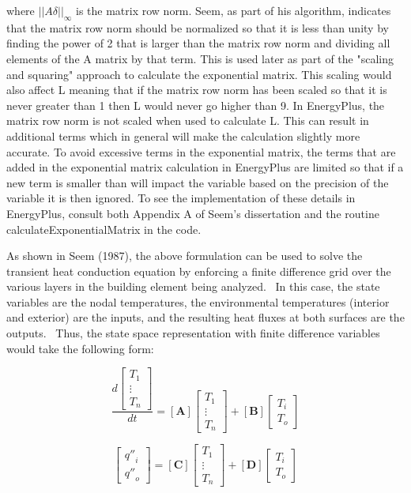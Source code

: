 where \(||A \delta||_\infty\) is the matrix row norm.  Seem, as part of his algorithm, indicates that the matrix row norm should be normalized so that it is less than unity by finding the power of 2 that is larger than the matrix row norm and dividing all elements of the A matrix by that term.  This is used later as part of the "scaling and squaring" approach to calculate the exponential matrix.  This scaling would also affect L meaning that if the matrix row norm has been scaled so that it is never greater than 1 then L would never go higher than 9.  In EnergyPlus, the matrix row norm is not scaled when used to calculate L.  This can result in additional terms which in general will make the calculation slightly more accurate.  To avoid excessive terms in the exponential matrix, the terms that are added in the exponential matrix calculation in EnergyPlus are limited so that if a new term is smaller than will impact the variable based on the precision of the variable it is then ignored.  To see the implementation of these details in EnergyPlus, consult both Appendix A of Seem's dissertation and the routine calculateExponentialMatrix in the code.

As shown in Seem (1987), the above formulation can be used to solve the transient heat conduction equation by enforcing a finite difference grid over the various layers in the building element being analyzed.~ In this case, the state variables are the nodal temperatures, the environmental temperatures (interior and exterior) are the inputs, and the resulting heat fluxes at both surfaces are the outputs.~ Thus, the state space representation with finite difference variables would take the following form:

\begin{equation}
\frac{d\left[\begin{array}{c}T_1 \\ \vdots \\ T_n\end{array}\right]}{dt} = \left[\mathbf{A}\right]\left[\begin{array}{c}T_1 \\ \vdots \\ T_n\end{array}\right]+\left[\mathbf{B}\right]\left[\begin{array}{c}T_i \\ T_o\end{array}\right]
\end{equation}

\begin{equation}
\left[\begin{array}{c}{q''}_i \\ {q''}_o\end{array}\right] = \left[\mathbf{C}\right]\left[\begin{array}{c}T_1 \\ \vdots \\ T_n\end{array}\right]+\left[\mathbf{D}\right]\left[\begin{array}{c}T_i \\ T_o\end{array}\right]
\end{equation}

